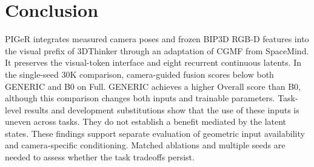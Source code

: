 \section{Conclusion}
PIGeR integrates measured camera poses and frozen BIP3D RGB-D features into the visual prefix of 3DThinker through an adaptation of CGMF from SpaceMind. It preserves the visual-token interface and eight recurrent continuous latents. In the single-seed 30K comparison, camera-guided fusion scores below both GENERIC and B0 on Full. GENERIC achieves a higher Overall score than B0, although this comparison changes both inputs and trainable parameters. Task-level results and development substitutions show that the use of these inputs is uneven across tasks. They do not establish a benefit mediated by the latent states. These findings support separate evaluation of geometric input availability and camera-specific conditioning. Matched ablations and multiple seeds are needed to assess whether the task tradeoffs persist.
